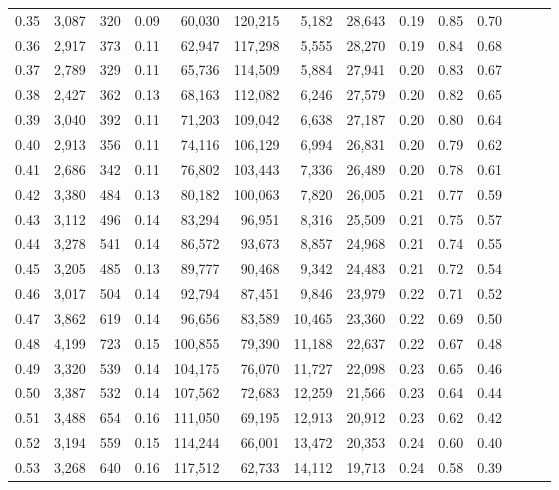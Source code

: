 \begin{tabular}{rrrrrrrrrrrrrr}
0.35 &  3,087 &  320 &  0.09 &   60,030 &  120,215 &   5,182 &  28,643 &  0.19 &  0.85 &      0.70 \\
0.36 &  2,917 &  373 &  0.11 &   62,947 &  117,298 &   5,555 &  28,270 &  0.19 &  0.84 &      0.68 \\
0.37 &  2,789 &  329 &  0.11 &   65,736 &  114,509 &   5,884 &  27,941 &  0.20 &  0.83 &      0.67 \\
0.38 &  2,427 &  362 &  0.13 &   68,163 &  112,082 &   6,246 &  27,579 &  0.20 &  0.82 &      0.65 \\
0.39 &  3,040 &  392 &  0.11 &   71,203 &  109,042 &   6,638 &  27,187 &  0.20 &  0.80 &      0.64 \\
0.40 &  2,913 &  356 &  0.11 &   74,116 &  106,129 &   6,994 &  26,831 &  0.20 &  0.79 &      0.62 \\
0.41 &  2,686 &  342 &  0.11 &   76,802 &  103,443 &   7,336 &  26,489 &  0.20 &  0.78 &      0.61 \\
0.42 &  3,380 &  484 &  0.13 &   80,182 &  100,063 &   7,820 &  26,005 &  0.21 &  0.77 &      0.59 \\
0.43 &  3,112 &  496 &  0.14 &   83,294 &   96,951 &   8,316 &  25,509 &  0.21 &  0.75 &      0.57 \\
0.44 &  3,278 &  541 &  0.14 &   86,572 &   93,673 &   8,857 &  24,968 &  0.21 &  0.74 &      0.55 \\
0.45 &  3,205 &  485 &  0.13 &   89,777 &   90,468 &   9,342 &  24,483 &  0.21 &  0.72 &      0.54 \\
0.46 &  3,017 &  504 &  0.14 &   92,794 &   87,451 &   9,846 &  23,979 &  0.22 &  0.71 &      0.52 \\
0.47 &  3,862 &  619 &  0.14 &   96,656 &   83,589 &  10,465 &  23,360 &  0.22 &  0.69 &      0.50 \\
0.48 &  4,199 &  723 &  0.15 &  100,855 &   79,390 &  11,188 &  22,637 &  0.22 &  0.67 &      0.48 \\
0.49 &  3,320 &  539 &  0.14 &  104,175 &   76,070 &  11,727 &  22,098 &  0.23 &  0.65 &      0.46 \\
0.50 &  3,387 &  532 &  0.14 &  107,562 &   72,683 &  12,259 &  21,566 &  0.23 &  0.64 &      0.44 \\
0.51 &  3,488 &  654 &  0.16 &  111,050 &   69,195 &  12,913 &  20,912 &  0.23 &  0.62 &      0.42 \\
0.52 &  3,194 &  559 &  0.15 &  114,244 &   66,001 &  13,472 &  20,353 &  0.24 &  0.60 &      0.40 \\
0.53 &  3,268 &  640 &  0.16 &  117,512 &   62,733 &  14,112 &  19,713 &  0.24 &  0.58 &      0.39 \\

\end{tabular}
